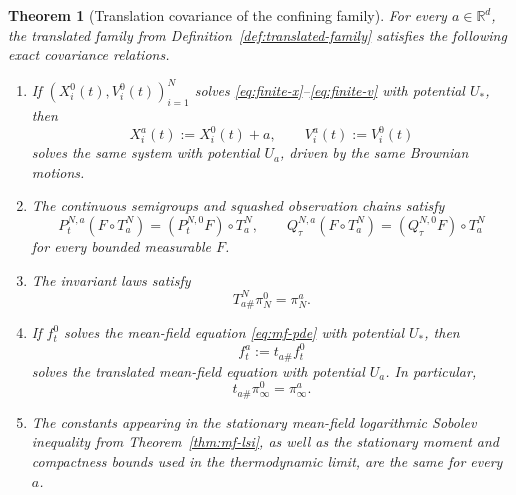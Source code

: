 \documentclass[11pt]{article}
\newtheorem{theorem}{Theorem}[section]
\theoremstyle{definition}
\theoremstyle{remark}
\newcommand{\R}{\mathbb{R}}
\begin{document}
\begin{theorem}[Translation covariance of the confining family]\label{thm:translated-family}
For every \(a\in\R^d\), the translated family from
Definition~\ref{def:translated-family} satisfies the following exact covariance
relations.
\begin{enumerate}[label=\textnormal{(\roman*)},leftmargin=1.5em]
\item If \((X_i^0(t),V_i^0(t))_{i=1}^N\) solves
\eqref{eq:finite-x}--\eqref{eq:finite-v} with potential \(U_*\), then
\[
X_i^a(t):=X_i^0(t)+a,
\qquad
V_i^a(t):=V_i^0(t)
\]
solves the same system with potential \(U_a\), driven by the same Brownian
motions.
\item The continuous semigroups and squashed observation chains satisfy
\[
P_t^{N,a}(F\circ T_a^N)=(P_t^{N,0}F)\circ T_a^N,
\qquad
Q_\tau^{N,a}(F\circ T_a^N)=(Q_\tau^{N,0}F)\circ T_a^N
\]
for every bounded measurable \(F\).
\item The invariant laws satisfy
\[
T_{a\#}^N\pi_N^0=\pi_N^a.
\]
\item If \(f_t^0\) solves the mean-field equation \eqref{eq:mf-pde} with
potential \(U_*\), then
\[
f_t^a:=t_{a\#}f_t^0
\]
solves the translated mean-field equation with potential \(U_a\). In particular,
\[
t_{a\#}\pi_\infty^0=\pi_\infty^a.
\]
\item The constants appearing in the stationary mean-field logarithmic Sobolev
inequality from Theorem~\ref{thm:mf-lsi}, as well as the stationary moment and
compactness bounds used in the thermodynamic limit, are the same for every
\(a\).
\end{enumerate}
\end{theorem}
\end{document}
